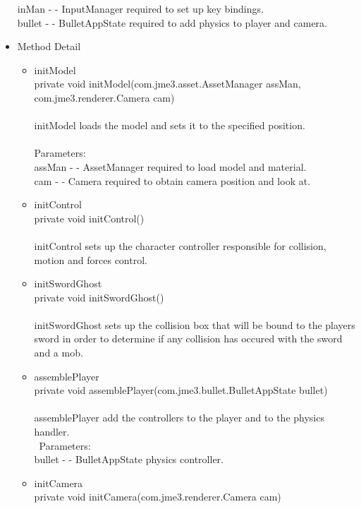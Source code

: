 \documentclass[letterpaper]{article}
\begin{document}
\begin{itemize}
								inMan - - InputManager required to set up key bindings. \\
								bullet - - BulletAppState required to add physics to player and camera.
						\item	Method Detail 
								\begin{itemize}
									\item	initModel \\
											private void initModel(com.jme3.asset.AssetManager assMan, \\
											com.jme3.renderer.Camera cam) \\ \\
											initModel loads the model and sets it to the specified position. \\ \\
											Parameters: \\
											assMan - - AssetManager required to load model and material. \\
											cam - - Camera required to obtain camera position and look at.
									\item	initControl \\
											private void initControl() \\ \\
											initControl sets up the character controller responsible for collision, motion and forces control.
									\item	initSwordGhost \\
											private void initSwordGhost() \\ \\
											initSwordGhost sets up the collision box that will be bound to the players sword in order to determine if any collision has occured with the sword and a mob.
									\item	assemblePlayer \\
											private void assemblePlayer(com.jme3.bullet.BulletAppState bullet) \\ \\
											assemblePlayer add the controllers to the player and to the physics handler. \\ \
											Parameters: \\
											bullet - - BulletAppState physics controller.
									\item	initCamera \\
											private void initCamera(com.jme3.renderer.Camera cam) \\ \\

\end{itemize}
\end{itemize}
\end{document}
